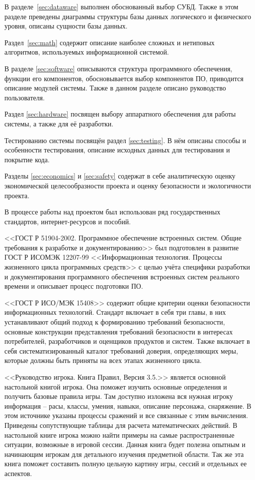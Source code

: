 В разделе~\ref{sec:dataware} выполнен обоснованный выбор СУБД. Также в этом разделе преведены диаграммы структуры базы данных логического и физического уровня, описаны сущности базы данных.

Раздел~\ref{sec:math} содержит описание наиболее сложных и нетиповых алгоритмов, используемых информационной системой.

В разделе \ref{sec:software} описываются структура программного обеспечения, функции его компонентов, обосновывается выбор компонентов ПО, приводится описание модулей системы. Также в данном разделе описано руководство пользователя.

Раздел \ref{sec:hardware} посвящен выбору аппаратного обеспечения для работы системы, а также для её разработки.

Тестированию системы посвящён раздел \ref{sec:testing}. В нём описаны способы и особенности тестирования, описание исходных данных для тестирования и покрытие кода.

Разделы \ref{sec:economics} и \ref{sec:safety} содержат в себе аналитическую оценку экономической целесообразности проекта и оценку безопасности и экологичности проекта.

В процессе работы над проектом был использован ряд государственных стандартов, интернет-ресурсов и пособий.

<<ГОСТ Р 51904-2002. Программное обеспечение встроенных систем. Общие требования к разработке и документированию>> был подготовлен в развитие ГОСТ Р ИСО\/МЭК 12207-99 <<Информационная технология. Процессы жизненного цикла программных средств>> с целью учёта специфики разработки и документирования программного обеспечения встроенных систем реального времени и описывает процесс подготовки ПО.

<<ГОСТ Р ИСО/МЭК 15408>> содержит общие критерии оценки безопасности информационных технологий. Стандарт включает в себя три главы, в них устанавливают общий подход к формированию требований безопасности, основные конструкции представления требований безопасности в интересах потребителей, разработчиков и оценщиков продуктов и систем. Также включает в себя систематизированный каталог требований доверия, определяющих меры, которые должны быть приняты на всех этапах жизненного цикла. 

<<Руководство игрока. Книга Правил, Версия 3.5.>> является основной настольной книгой игрока. Она поможет изучить основные определения и получить базовые правила игры. Там доступно изложена вся нужная игроку информация – расы, классы, умения, навыки, описание персонажа, снаряжение. В этом источнике указаны процессы сражений и все связанные с этим вычисления. Приведены сопутствующие таблицы для расчета математических действий. В настольной книге игрока можно найти примеры на самые распространенные ситуации, возможные в игровой сессии. Данная книга будет полезна опытным и начинающим игрокам для детального изучения предметной области. Так же эта книга поможет составить полную цельную картину игры, сессий и отдельных ее аспектов.

